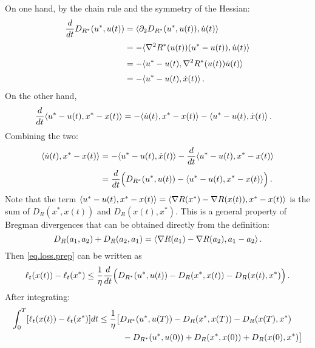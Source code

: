 \documentclass[12pt]{report}
\theoremstyle{plain}
\theoremstyle{definition}
\theoremstyle{remark}
\begin{document}
On one hand, by the chain rule and the symmetry of the Hessian:
\begin{align*}
\frac{d}{dt} D_{R^{*}}(u^{*}, u(t))
&= \langle { \partial_{2} D_{R^{*}}(u^{*}, u(t)), \dot{u}(t)}\rangle \\[1mm]
&= - \langle { \nabla^2 R^{*}(u(t))(u^{*} -u(t)), \dot{u}(t) }\rangle \\[1mm]
&= - \langle { u^{*} -u(t), \nabla^2 R^{*}(u(t)) \dot{u}(t) }\rangle \\[1mm]
&= - \langle {u^{*} - u(t), \dot{x}(t)}\rangle\,.
\end{align*}
On the other hand,
\begin{align*}
\frac{d}{dt} \langle {u^{*} - u(t), x^{*} - x(t)}\rangle
&= - \langle { \dot{u}(t), x^{*} - x(t)}\rangle - \langle { u^{*} -u(t), \dot{x}(t) }\rangle\,.
\end{align*}
Combining the two:
\begin{align*}
\langle { \dot{u}(t), x^{*} - x(t)}\rangle 
&= - \langle { u^{*} -u(t), \dot{x}(t) }\rangle - \frac{d}{dt} \langle {u^{*} - u(t), x^{*} - x(t)}\rangle \\[1mm]
&= \frac{d}{dt} \Bigl( D_{R^{*}}(u^{*}, u(t)) - \langle {u^{*} - u(t), x^{*} - x(t)}\rangle \Bigr)\,.
\end{align*}
Note that the term 
$\langle {u^{*} - u(t), x^{*} - x(t)}\rangle = \langle {\nabla R(x^{*}) - \nabla R(x(t)), x^{*} - x(t)}\rangle$
is the sum of $D_{R}(x^{*}, x(t))$ and $D_{R}(x(t), x^{*})$.
This is a general property of Bregman divergences that can be obtained directly from the definition:
$$
D_{R}(a_{1}, a_{2}) + D_{R}(a_{2}, a_{1})
= \langle {\nabla R(a_{1}) - \nabla R(a_{2}), a_{1} - a_{2}}\rangle\,.
$$
Then \eqref{eq.loss.prep} can be written as
\begin{equation*}
\ell_{t}(x(t)) - \ell_{t}(x^{*}) 
\leq  \frac{1}{\eta} \frac{d}{dt} \Bigl( D_{R^{*}}(u^{*}, u(t)) - D_{R}(x^{*}, x(t)) - D_{R}(x(t), x^{*})\Bigr)\,.
\end{equation*}
After integrating:
\begin{align*}
\int_{0}^{T} [\ell_{t}(x(t)) - \ell_{t}(x^{*})] dt
&\leq \frac{1}{\eta} \bigl[ D_{R^{*}}(u^{*}, u(T)) - D_{R}(x^{*}, x(T)) - D_{R}(x(T), x^{*}) \\
&\hspace{10mm}- D_{R^{*}}(u^{*}, u(0)) + D_{R}(x^{*}, x(0)) + D_{R}(x(0), x^{*}) \bigr]
\end{align*}
\end{document}
